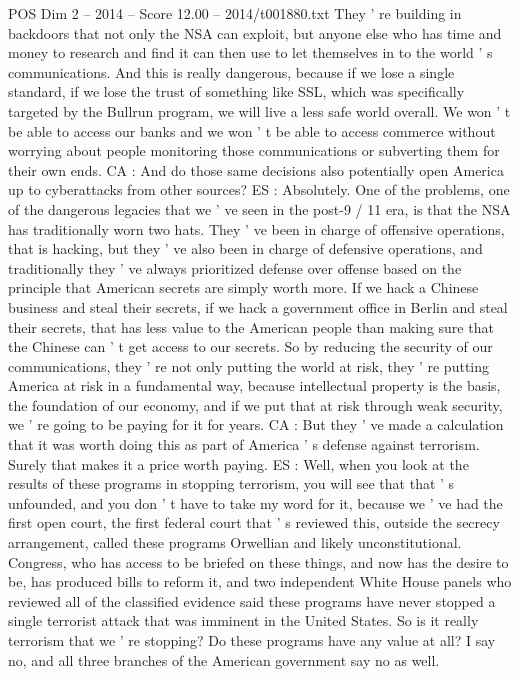 \begin{textsample}{POS Dim 2 – 2014 – Score 12.00 – 2014/t001880.txt}
They ' re building in backdoors that not only the NSA can exploit, but anyone else who has time and money to research and find it can then use to let themselves in to the world ' s communications.
And this is really dangerous, because if we lose a single standard, if we lose the trust of something like SSL, which was specifically targeted by the Bullrun program, we will live a less safe world overall.
We won ' t be able to access our banks and we won ' t be able to access commerce without worrying about people monitoring those communications or subverting them for their own ends.
CA : And do those same decisions also potentially open America up to cyberattacks from other sources?
ES : Absolutely.
One of the problems, one of the dangerous legacies that we ' ve seen in the post-9 / 11 era, is that the NSA has traditionally worn two hats.
They ' ve been in charge of offensive operations, that is hacking, but they ' ve also been in charge of defensive operations, and traditionally they ' ve always prioritized defense over offense based on the principle that American secrets are simply worth more.
If we hack a Chinese business and steal their secrets, if we hack a government office in Berlin and steal their secrets, that has less value to the American people than making sure that the Chinese can ' t get access to our secrets.
So by reducing the security of our communications, they ' re not only putting the world at risk, they ' re putting America at risk in a fundamental way, because intellectual property is the basis, the foundation of our economy, and if we put that at risk through weak security, we ' re going to be paying for it for years.
CA : But they ' ve made a calculation that it was worth doing this as part of America ' s defense against terrorism.
Surely that makes it a price worth paying.
ES : Well, when you look at the results of these programs in stopping terrorism, you will see that that ' s unfounded, and you don ' t have to take my word for it, because we ' ve had the first open court, the first federal court that ' s reviewed this, outside the secrecy arrangement, called these programs Orwellian and likely unconstitutional.
Congress, who has access to be briefed on these things, and now has the desire to be, has produced bills to reform it, and two independent White House panels who reviewed all of the classified evidence said these programs have never stopped a single terrorist attack that was imminent in the United States.
So is it really terrorism that we ' re stopping?
Do these programs have any value at all?
I say no, and all three branches of the American government say no as well.

\end{textsample}
